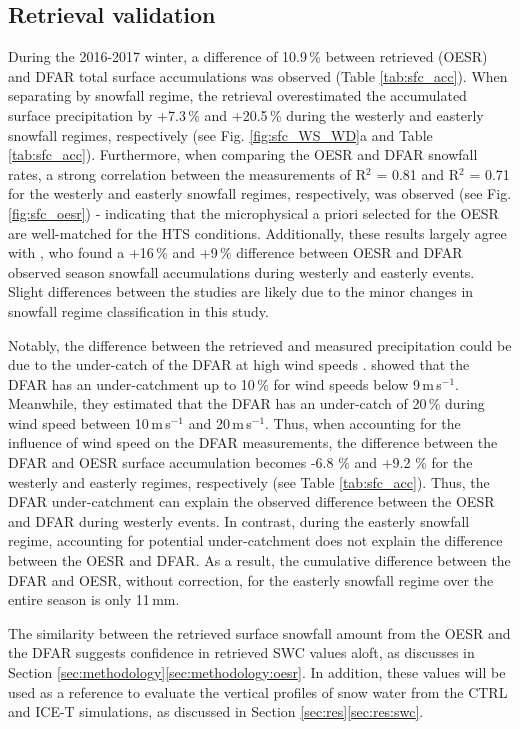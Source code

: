 \documentclass{ametsocV5}
\begin{document}
	\subsection{Retrieval validation}
		During the 2016-2017 winter, a difference of 10.9\,\% between retrieved (OESR) and DFAR total surface accumulations was observed (Table \ref{tab:sfc_acc}). When separating by snowfall regime, the retrieval overestimated the accumulated surface precipitation by +7.3\,\% and +20.5\,\% during the westerly and easterly snowfall regimes, respectively (see Fig. \ref{fig:sfc_WS_WD}a and Table \ref{tab:sfc_acc}). Furthermore, when comparing the OESR and DFAR snowfall rates,  a strong correlation between the measurements of R$^2$ = 0.81 and R$^2$ = 0.71 for the westerly and easterly snowfall regimes, respectively, was observed (see Fig. \ref{fig:sfc_oesr}) - indicating that the microphysical a priori selected for the OESR are well-matched for the HTS conditions. Additionally, these results largely agree with \citet{schirle_estimation_2019}, who found a +16\,\% and +9\,\% difference between OESR and DFAR observed season snowfall accumulations during westerly and easterly events. Slight differences between the studies are likely due to the minor changes in snowfall regime classification in this study.

		Notably, the difference between the retrieved and measured precipitation could be due to the under-catch of the DFAR at high wind speeds \citep{theriault_impact_2015,nitu_iom_2018,colli_adjustments_2020}. \citet{nitu_iom_2018} showed that the DFAR has an under-catchment up to 10\,\% for wind speeds below 9\,m\,s$^{-1}$. Meanwhile, they estimated that the DFAR has an under-catch of 20\,\% during wind speed between 10\,m\,s$^{-1}$ and 20\,m\,s$^{-1}$. Thus, when accounting for the influence of wind speed on the DFAR measurements, the difference between the DFAR and OESR surface accumulation becomes -6.8 \% and +9.2 \% for the westerly and easterly regimes, respectively (see Table \ref{tab:sfc_acc}). Thus, the DFAR under-catchment can explain the observed difference between the OESR and DFAR during westerly events. In contrast, during the easterly snowfall regime, accounting for potential under-catchment does not explain the difference between the OESR and DFAR. As a result, the cumulative difference between the DFAR and OESR, without correction, for the easterly snowfall regime over the entire season is only 11\,mm. 

		The similarity between the retrieved surface snowfall amount from the OESR and the DFAR suggests confidence in retrieved SWC values aloft, as discusses in Section \ref{sec:methodology}\ref{sec:methodology:oesr}. In addition, these values will be used as a reference to evaluate the vertical profiles of snow water from the CTRL and ICE-T simulations, as discussed in Section \ref{sec:res}\ref{sec:res:swc}.
	
\end{document}
